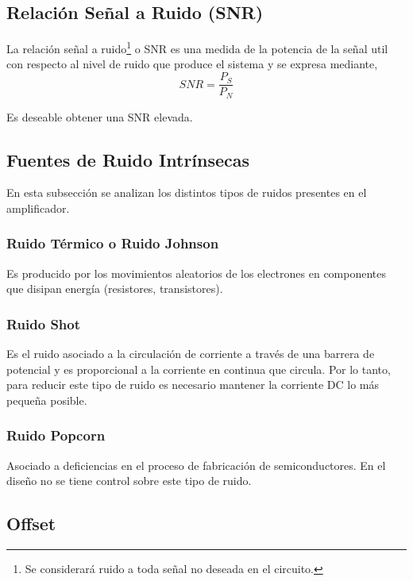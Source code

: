 \documentclass[a4paper,12pt,twoside]{article}
\begin{document}
\subsection{Relación Señal a Ruido (SNR)}

La relación señal a ruido\footnote{Se considerará ruido a toda señal no deseada en el circuito.} o SNR es una medida de la potencia de la señal util con respecto al nivel de ruido que produce el sistema y se expresa mediante,
\begin{equation} SNR=\frac{P_{S}}{P_{N}} \end{equation}

Es deseable obtener una SNR elevada.

\subsection{Fuentes de Ruido Intrínsecas}

En esta subsección se analizan los distintos tipos de ruidos presentes en el amplificador.

\subsubsection{Ruido Térmico o Ruido Johnson}

Es producido por los movimientos aleatorios de los electrones en componentes que disipan energía (resistores, transistores).

\subsubsection{Ruido Shot}

Es el ruido asociado a la circulación de corriente a través de una barrera de potencial y es proporcional a la corriente en continua que circula. Por lo tanto, para reducir este tipo de ruido es necesario mantener la corriente DC lo más pequeña posible.

\subsubsection{Ruido Popcorn}

Asociado a deficiencias en el proceso de fabricación de semiconductores. En el diseño no se tiene control sobre este tipo de ruido.

\subsection{Offset}
\end{document}

